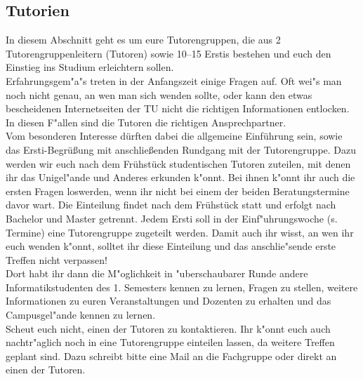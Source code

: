 \subsection{Tutorien}



In diesem Abschnitt geht es um eure Tutorengruppen, die aus 2 Tutorengruppenleitern (Tutoren) sowie 10--15 Erstis bestehen und euch den Einstieg ins Studium erleichtern sollen.\\
Erfahrungsgem"a"s treten in der Anfangszeit einige Fragen auf. Oft wei"s man noch nicht genau, an wen man sich wenden sollte, oder kann den etwas bescheidenen Internetseiten der TU nicht die richtigen Informationen entlocken. In diesen F"allen sind die Tutoren die richtigen Ansprechpartner.\\

Vom besonderen Interesse dürften dabei die allgemeine Einführung sein,
sowie das Ersti-Begrüßung mit anschließenden Rundgang mit der
Tutorengruppe.
Dazu werden wir euch nach dem Frühstück studentischen 
Tutoren zuteilen, mit denen ihr das Unigel"ande und Anderes erkunden 
k"onnt. Bei ihnen k"onnt ihr auch die ersten Fragen loswerden, wenn 
ihr nicht bei einem der beiden Beratungstermine davor wart.
Die Einteilung findet nach dem Frühstück statt und erfolgt nach
Bachelor und Master getrennt.
Jedem Ersti soll in der Einf"uhrungswoche (s. Termine) eine Tutorengruppe zugeteilt werden. Damit auch ihr wisst, an wen ihr euch wenden k"onnt, solltet ihr diese Einteilung und das anschlie"sende erste Treffen nicht verpassen!\\
Dort habt ihr dann die M"oglichkeit in "uberschaubarer Runde andere Informatikstudenten des 1. Semesters kennen zu lernen, Fragen zu stellen, weitere Informationen zu euren Veranstaltungen und Dozenten zu erhalten und das Campusgel"ande kennen zu lernen.\\
Scheut euch nicht, einen der Tutoren zu kontaktieren. Ihr k"onnt euch auch nachtr"aglich noch in eine Tutorengruppe einteilen lassen, da weitere Treffen geplant sind. Dazu schreibt bitte eine Mail an die Fachgruppe  oder direkt an einen der Tutoren.\\

